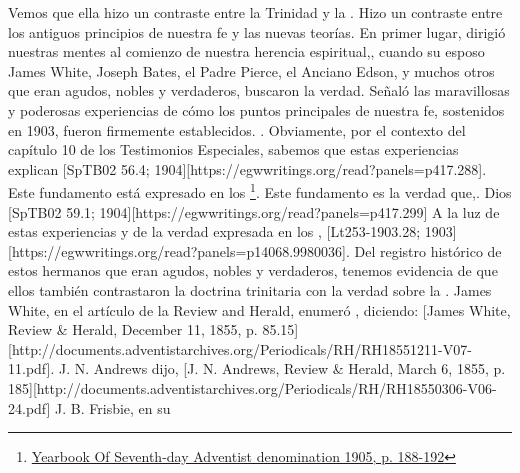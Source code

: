 Vemos que ella hizo un contraste entre la Trinidad y la . Hizo un contraste entre los antiguos principios de nuestra fe y las nuevas teorías. En primer lugar, dirigió nuestras mentes al comienzo de nuestra herencia espiritual,, cuando su esposo James White, Joseph Bates, el Padre Pierce, el Anciano Edson, y muchos otros que eran agudos, nobles y verdaderos, buscaron la verdad. Señaló las maravillosas y poderosas experiencias de cómo los puntos principales de nuestra fe, sostenidos en 1903, fueron firmemente establecidos.   . Obviamente, por el contexto del capítulo 10 de los Testimonios Especiales, sabemos que estas experiencias explican [SpTB02 56.4; 1904][https://egwwritings.org/read?panels=p417.288]. Este fundamento está expresado en los \footnote{\href{https://static1.squarespace.com/static/554c4998e4b04e89ea0c4073/t/59d17e24c027d84167e17617/1506901547915/SDA-YB1905+\%28P.+188-192\%29.pdf}{Yearbook Of Seventh-day Adventist denomination 1905, p. 188-192}}. Este fundamento es la verdad que,. Dios [SpTB02 59.1; 1904][https://egwwritings.org/read?panels=p417.299] A la luz de estas experiencias y de la verdad expresada en los , [Lt253-1903.28; 1903][https://egwwritings.org/read?panels=p14068.9980036]. Del registro histórico de estos hermanos que eran agudos, nobles y verdaderos, tenemos evidencia de que ellos también contrastaron la doctrina trinitaria con la verdad sobre la . James White, en el artículo de la Review and Herald, enumeró , diciendo: [James White, Review \& Herald, December 11, 1855, p. 85.15][http://documents.adventistarchives.org/Periodicals/RH/RH18551211-V07-11.pdf]. J. N. Andrews dijo, [J. N. Andrews, Review \& Herald, March 6, 1855, p. 185][http://documents.adventistarchives.org/Periodicals/RH/RH18550306-V06-24.pdf] J. B. Frisbie, en su 